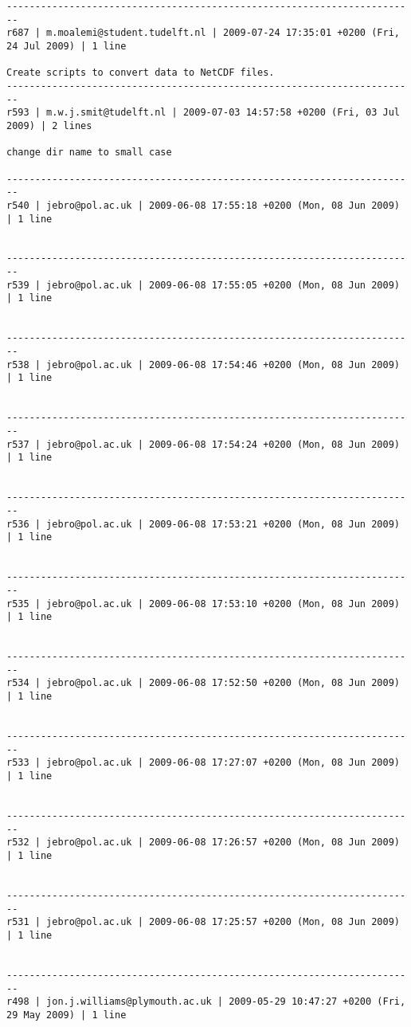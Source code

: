 \documentclass[9]{report}
\begin{document}
\begin{description}
\begin{verbatim}
------------------------------------------------------------------------
r687 | m.moalemi@student.tudelft.nl | 2009-07-24 17:35:01 +0200 (Fri, 24 Jul 2009) | 1 line

Create scripts to convert data to NetCDF files.
------------------------------------------------------------------------
r593 | m.w.j.smit@tudelft.nl | 2009-07-03 14:57:58 +0200 (Fri, 03 Jul 2009) | 2 lines

change dir name to small case

------------------------------------------------------------------------
r540 | jebro@pol.ac.uk | 2009-06-08 17:55:18 +0200 (Mon, 08 Jun 2009) | 1 line


------------------------------------------------------------------------
r539 | jebro@pol.ac.uk | 2009-06-08 17:55:05 +0200 (Mon, 08 Jun 2009) | 1 line


------------------------------------------------------------------------
r538 | jebro@pol.ac.uk | 2009-06-08 17:54:46 +0200 (Mon, 08 Jun 2009) | 1 line


------------------------------------------------------------------------
r537 | jebro@pol.ac.uk | 2009-06-08 17:54:24 +0200 (Mon, 08 Jun 2009) | 1 line


------------------------------------------------------------------------
r536 | jebro@pol.ac.uk | 2009-06-08 17:53:21 +0200 (Mon, 08 Jun 2009) | 1 line


------------------------------------------------------------------------
r535 | jebro@pol.ac.uk | 2009-06-08 17:53:10 +0200 (Mon, 08 Jun 2009) | 1 line


------------------------------------------------------------------------
r534 | jebro@pol.ac.uk | 2009-06-08 17:52:50 +0200 (Mon, 08 Jun 2009) | 1 line


------------------------------------------------------------------------
r533 | jebro@pol.ac.uk | 2009-06-08 17:27:07 +0200 (Mon, 08 Jun 2009) | 1 line


------------------------------------------------------------------------
r532 | jebro@pol.ac.uk | 2009-06-08 17:26:57 +0200 (Mon, 08 Jun 2009) | 1 line


------------------------------------------------------------------------
r531 | jebro@pol.ac.uk | 2009-06-08 17:25:57 +0200 (Mon, 08 Jun 2009) | 1 line


------------------------------------------------------------------------
r498 | jon.j.williams@plymouth.ac.uk | 2009-05-29 10:47:27 +0200 (Fri, 29 May 2009) | 1 line



\end{verbatim}
\end{description}
\end{document}
